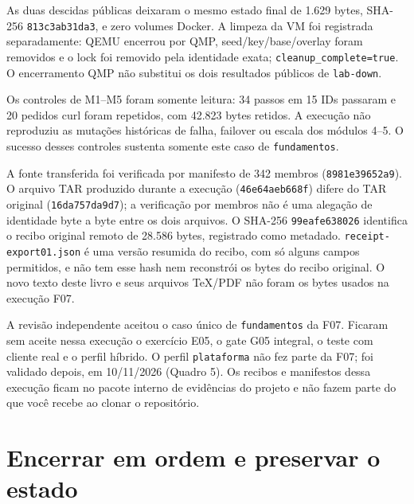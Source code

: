 \documentclass[12pt,openany,oneside,a4paper,chapter=TITLE,english,brazil]{abntex2}
\begin{document}
\begin{apendicesenv}
As duas descidas públicas deixaram o mesmo estado final de 1.629 bytes,
SHA-256 \texttt{813c3ab31da3}, e zero volumes Docker. A limpeza da VM foi registrada
separadamente: QEMU encerrou por QMP, seed/key/base/overlay foram removidos e
o lock foi removido pela identidade exata; \texttt{cleanup\_\allowbreak{}complete=\allowbreak{}true}. O encerramento
QMP não substitui os dois resultados públicos de \texttt{lab-{}\allowbreak{}down}.

Os controles de M1--M5 foram somente leitura: 34 passos em 15 IDs passaram e
20 pedidos curl foram repetidos, com 42.823 bytes retidos. A execução não
reproduziu as mutações históricas de falha, failover ou escala dos módulos 4--5.
O sucesso desses controles sustenta somente este caso de \texttt{fundamentos}.

A fonte transferida foi verificada por manifesto de 342 membros
(\texttt{8981e39652a9}). O arquivo TAR produzido durante a execução
(\texttt{46e64aeb668f}) difere do TAR original (\texttt{16da757da9d7}); a verificação por
membros não é uma alegação de identidade byte a byte entre os dois arquivos.
O SHA-256 \texttt{99eafe638026} identifica o recibo original remoto de 28.586 bytes,
registrado como metadado. \texttt{receipt-{}\allowbreak{}export01.\allowbreak{}json} é uma versão resumida do recibo, com só alguns campos
permitidos, e não tem esse hash nem reconstrói os bytes do recibo original. O novo texto deste
livro e seus arquivos TeX/PDF não foram os bytes usados na execução F07.

A revisão independente aceitou o caso único de \texttt{fundamentos} da F07. Ficaram sem aceite nessa execução o exercício E05, o gate G05 integral, o teste com cliente real e o perfil híbrido. O perfil \texttt{plataforma} não fez parte da F07; foi validado depois, em 10/11/2026 (Quadro 5). Os recibos e manifestos dessa execução ficam no pacote interno de evidências do projeto e não fazem parte do que você recebe ao clonar o repositório.

\section*{Encerrar em ordem e preservar o estado}\label{encerrar-em-ordem-e-preservar-o-estado}


\end{apendicesenv}
\end{document}
